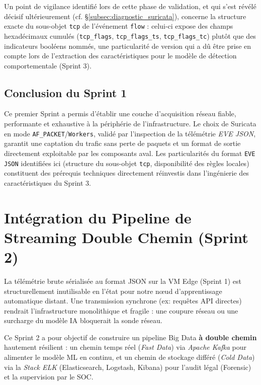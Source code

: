 Un point de vigilance identifié lors de cette phase de validation, et qui s'est révélé décisif ultérieurement (cf. \S\ref{subsec:diagnostic_suricata}), concerne la structure exacte du sous-objet \texttt{tcp} de l'événement \texttt{flow} : celui-ci expose des champs hexadécimaux cumulés (\texttt{tcp\_flags}, \texttt{tcp\_flags\_ts}, \texttt{tcp\_flags\_tc}) plutôt que des indicateurs booléens nommés, une particularité de version qui a dû être prise en compte lors de l'extraction des caractéristiques pour le modèle de détection comportementale (Sprint 3).

\subsection{Conclusion du Sprint 1}
Ce premier Sprint a permis d'établir une couche d'acquisition réseau fiable, performante et exhaustive à la périphérie de l'infrastructure. Le choix de Suricata en mode \texttt{AF\_PACKET}/\texttt{Workers}, validé par l'inspection de la télémétrie \textit{EVE JSON}, garantit une captation du trafic sans perte de paquets et un format de sortie directement exploitable par les composants aval. Les particularités du format \texttt{EVE JSON} identifiées ici (structure du sous-objet \texttt{tcp}, disponibilité des règles locales) constituent des prérequis techniques directement réinvestis dans l'ingénierie des caractéristiques du Sprint 3.

\section{Intégration du Pipeline de Streaming Double Chemin (Sprint 2)}

La télémétrie brute sérialisée au format JSON sur la VM Edge (Sprint 1) est structurellement inutilisable en l'état pour notre nœud d'apprentissage automatique distant. Une transmission synchrone (ex: requêtes API directes) rendrait l'infrastructure monolithique et fragile : une coupure réseau ou une surcharge du modèle IA bloquerait la sonde réseau.

Ce Sprint 2 a pour objectif de construire un pipeline Big Data \textbf{à double chemin} hautement résilient : un chemin temps réel (\textit{Fast Data}) via \textit{Apache Kafka} pour alimenter le modèle ML en continu, et un chemin de stockage différé (\textit{Cold Data}) via la \textit{Stack ELK} (Elasticsearch, Logstash, Kibana) pour l'audit légal (Forensic) et la supervision par le SOC.

